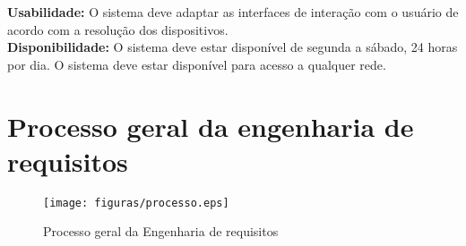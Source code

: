 \begin{anexosenv}
\textbf{Usabilidade:} O sistema deve adaptar as interfaces de interação com o usuário de acordo com a resolução dos dispositivos.\\

\textbf{Disponibilidade:} O sistema deve estar disponível de segunda a sábado, 24 horas por dia. O sistema deve estar disponível para acesso a qualquer rede.\\

\chapter[Processo geral]{Processo geral da engenharia de requisitos}

\begin{figure}
    \centering
    \texttt{[image: figuras/processo.eps]}
    \caption[Processo geral]{Processo geral da Engenharia de requisitos}
\end{figure}
\end{anexosenv}
